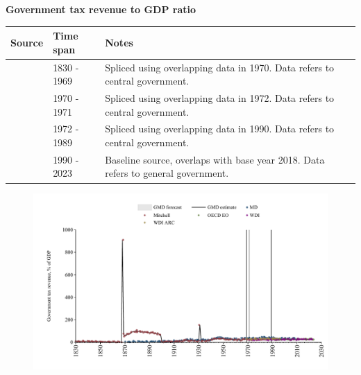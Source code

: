\documentclass[12pt,a4paper,landscape]{article}
\begin{document}
\begin{adjustbox}{max totalsize={\paperwidth}{\paperheight},center}
\begin{minipage}[t][\textheight][t]{\textwidth}
\vspace*{0.5cm}
{}
\begin{center}
{\Large\bfseries Government tax revenue to GDP ratio}
\end{center}
\vspace{0.5cm}
\begin{table}[H]
\centering
\small
\begin{tabular}{|l|l|l|}
\hline
\textbf{Source} & \textbf{Time span} & \textbf{Notes} \\
\hline
\rowcolor{white}\cite{Mitchell}& 1830 - 1969 &Spliced using overlapping data in 1970. Data refers to central government.\\
\rowcolor{lightgray}\cite{WDI_ARC}& 1970 - 1971 &Spliced using overlapping data in 1972. Data refers to central government.\\
\rowcolor{white}\cite{WDI}& 1972 - 1989 &Spliced using overlapping data in 1990. Data refers to central government.\\
\rowcolor{lightgray}\cite{OECD_EO}& 1990 - 2023 &Baseline source, overlaps with base year 2018. Data refers to general government.\\
\hline
\end{tabular}
\end{table}
\begin{figure}[H]
\centering
\includegraphics[width=\textwidth,height=0.6\textheight,keepaspectratio]{graphs/GBR_govtax_GDP.pdf}
\end{figure}
\end{minipage}
\end{adjustbox}
\end{document}
